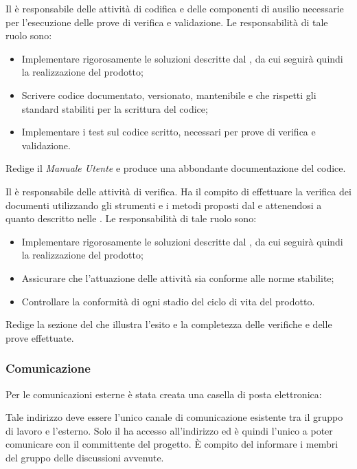 \documentclass[12pt,a4paper]{article}
\begin{document}
Il \PR{} è responsabile delle attività di codifica e delle componenti di ausilio necessarie per l'esecuzione delle prove di verifica e validazione. Le responsabilità di tale ruolo sono:
\begin{itemize}
  \item Implementare rigorosamente le soluzioni descritte dal \PG{}, da cui seguirà quindi la realizzazione del prodotto;
  \item Scrivere codice documentato, versionato, mantenibile e che rispetti gli standard stabiliti per la scrittura del codice;
  \item Implementare i test sul codice scritto, necessari per prove di verifica e validazione.
\end{itemize}
Redige il \textit{Manuale Utente} e produce una abbondante documentazione del codice.

Il \VR{} è responsabile delle attività di verifica. Ha il compito di effettuare la verifica dei documenti utilizzando gli strumenti e i metodi proposti dal \PdQ{} e attenendosi a quanto descritto nelle \NdP{}. 
Le responsabilità di tale ruolo sono:
\begin{itemize}
  \item Implementare rigorosamente le soluzioni descritte dal \PG{}, da cui seguirà quindi la realizzazione del prodotto;
  \item Assicurare che l'attuazione delle attività sia conforme alle norme stabilite;
  \item Controllare la conformità di ogni stadio del ciclo di vita del prodotto.
\end{itemize}
Redige la sezione del \PdQ{} che illustra l'esito e la completezza delle verifiche
e delle prove effettuate.

\newpage
\subsubsection{Comunicazione}
Per le comunicazioni esterne è stata creata una casella di posta elettronica:
\begin{center}
\href{mailto:\mailGruppo{}}{\mailGruppo{}}
\end{center}
Tale indirizzo deve essere l'unico canale di comunicazione esistente tra il gruppo di lavoro e l'esterno. Solo il \PM{} ha accesso all'indirizzo ed è quindi l'unico a poter comunicare con il committente del progetto. È compito del \PM{} informare i membri del gruppo delle discussioni avvenute.
\end{document}
